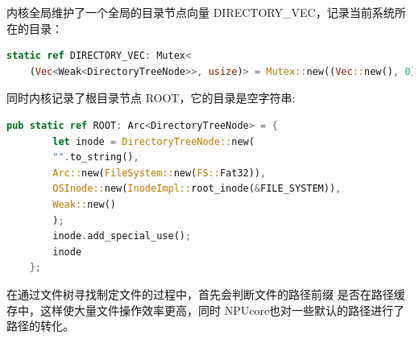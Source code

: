 内核全局维护了一个全局的目录节点向量 DIRECTORY\_VEC，记录当前系统所在的目录：
\begin{lstlisting}[language=Rust]
	static ref DIRECTORY_VEC: Mutex<
	(Vec<Weak<DirectoryTreeNode>>, usize)> = Mutex::new((Vec::new(), 0));
\end{lstlisting}

同时内核记录了根目录节点 ROOT，它的目录是空字符串:

\begin{lstlisting}[language=Rust]
	pub static ref ROOT: Arc<DirectoryTreeNode> = {
		let inode = DirectoryTreeNode::new(
		"".to_string(),
		Arc::new(FileSystem::new(FS::Fat32)),
		OSInode::new(InodeImpl::root_inode(&FILE_SYSTEM)),
		Weak::new()
		);
		inode.add_special_use();
		inode
	};
\end{lstlisting}

在通过文件树寻找制定文件的过程中，首先会判断文件的路径前缀
是否在路径缓存中，这样使大量文件操作效率更高，同时
NPUcore也对一些默认的路径进行了路径的转化。

